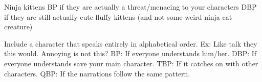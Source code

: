 \documentclass[a4paper,12pt]{article}
\begin{document}
Ninja kittens
BP if they are actually a threat/menacing to your characters
DBP if they are still actually cute fluffy kittens (and not some weird ninja cat creature)

Include a character that speaks entirely in alphabetical order.
Ex: Like talk they this would. Annoying is not this?
BP: If everyone understands him/her.
DBP: If everyone understands save your main character.
TBP: If it catches on with other characters.
QBP: If the narrations follow the same pattern.
\end{document}
